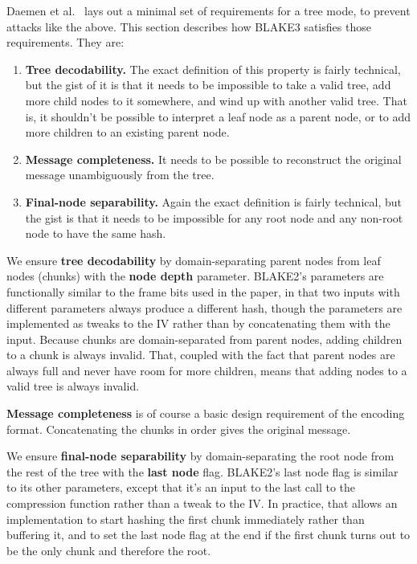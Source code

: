 \documentclass[11pt,notitlepage,a4paper]{article}
\begin{document}
Daemen et al.~\cite{DBLP:journals/ijisec/BertoniDPA14,DBLP:journals/tosc/DaemenMA18} lays out a minimal set of requirements for a tree mode, to prevent attacks like the above. This section describes how BLAKE3 satisfies those requirements. They are:
\begin{enumerate}
\item \textbf{Tree decodability.} The exact definition of this property is fairly technical, but the gist of it is that it needs to be impossible to take a valid tree, add more child nodes to it somewhere, and wind up with another valid tree. That is, it shouldn't be possible to interpret a leaf node as a parent node, or to add more children to an existing parent node.
\item \textbf{Message completeness.} It needs to be possible to reconstruct the original message unambiguously from the tree.
\item \textbf{Final-node separability.} Again the exact definition is fairly technical, but the gist is that it needs to be impossible for any root node and any non-root node to have the same hash.
\end{enumerate}
We ensure \textbf{tree decodability} by domain-separating parent nodes from leaf nodes (chunks) with the \textbf{node depth} parameter. BLAKE2's parameters are functionally similar to the frame bits used in the paper, in that two inputs with different parameters always produce a different hash, though the parameters are implemented as tweaks to the IV rather than by concatenating them with the input. Because chunks are domain-separated from parent nodes, adding children to a chunk is always invalid. That, coupled with the fact that parent nodes are always full and never have room for more children, means that adding nodes to a valid tree is always invalid.

\textbf{Message completeness} is of course a basic design requirement of the encoding format. Concatenating the chunks in order gives the original message.

We ensure \textbf{final-node separability} by domain-separating the root node from the rest of the tree with the \textbf{last node} flag. BLAKE2's last node flag is similar to its other parameters, except that it's an input to the last call to the compression function rather than a tweak to the IV. In practice, that allows an implementation to start hashing the first chunk immediately rather than buffering it, and to set the last node flag at the end if the first chunk turns out to be the only chunk and therefore the root.
\end{document}
